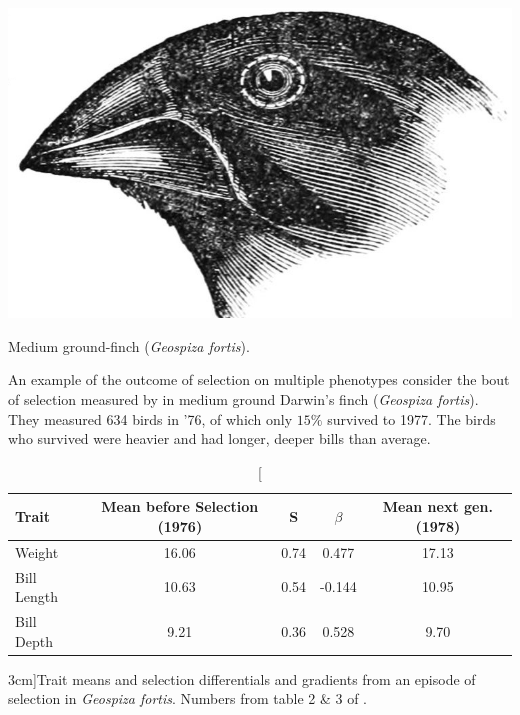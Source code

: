 


\begin{marginfigure}
\begin{center}
\includegraphics[width= 0.7 \textwidth]{illustration_images/Quant_gen/Darwins_Finch/Geospiza_fortis_head.png}
\end{center}
\caption{Medium ground-finch ({\it Geospiza fortis}). } \label{fig:Geospiza_fortis_head}  
\end{marginfigure}
 An example of the outcome of selection on multiple phenotypes
 consider the bout of selection measured by
 \citet{grant1995predicting}  in medium ground Darwin's
 finch ({\it Geospiza fortis}).  They measured 634 birds in '76, of
 which only $15\%$ survived to 1977. The birds who survived were
 heavier and had longer, deeper bills than average.\\
 \begin{table}
 \begin{tabular}{lcccc}\\
 {\small Trait} & {\small Mean before Selection (1976)} & S & $\beta$
   & {\small Mean next gen. (1978)}\\
   \hline
 Weight & 16.06 & 0.74 & 0.477 & 17.13 \\
Bill Length & 10.63 &  0.54  & -0.144  & 10.95 \\
  Bill Depth & 9.21 & 0.36 & 0.528  &  9.70 
 \end{tabular}
 \caption[][3cm]{Trait means and selection differentials and gradients from an
   episode of selection in {\it Geospiza fortis}. Numbers from table
   2 \& 3 of \citet{grant1995predicting}.}
\end{table}

